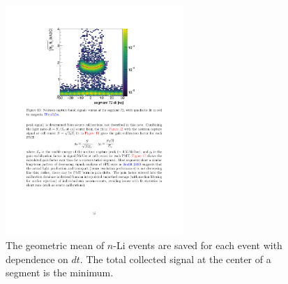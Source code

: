 \begin{figure}[h!]
\centering
\includegraphics[width=0.6\textwidth]{Figures/GeometricMean.pdf}
\caption[The geometric mean of $n$-Li events ] {
The geometric mean of $n$-Li events are saved for each event with dependence on $dt$.
The total collected signal at the center of a segment is the minimum.
}
\label{fig:GeoMean}
\end{figure}

